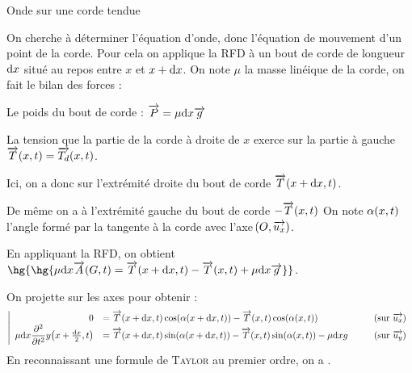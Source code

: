 \documentclass[a4paper,french,bookmarks]{book}
\begin{document}
\begin{example}{Onde sur une corde tendue}{}
\begin{minipage}{0.5\linewidth}
\begin{center}
            \end{center}
        \end{minipage}
        On cherche à déterminer l'équation d'onde, donc l'équation de mouvement d'un point de la corde. Pour cela on applique la RFD à un bout de corde de longueur $\mathrm d x$ situé au repos entre $x$ et $x+\mathrm d x$. On note $\mu$ la masse linéique de la corde, on fait le bilan des forces :
        \begin{enumerate}
            \itt Le poids du bout de corde : $\overrightarrow{P} = \mu\mathrm d x \overrightarrow{g}$
            
            \itt La tension que la partie de la corde à droite de $x$ exerce sur la partie à gauche $\overrightarrow{T}\!\left(x,t\right) = \overrightarrow{T_d}\!\left(x,t\right)$.
            
            Ici, on a donc sur l'extrémité droite du bout de corde $\overrightarrow{T}\!\left(x+\mathrm d x,t\right)$.
            
            De même on a à l'extrémité gauche du bout de corde  $-\overrightarrow{T}\!\left(x,t\right)$
            On note $\alpha\!\left(x,t\right)$ l'angle formé par la tangente à la corde avec l'axe $\!\left(O, \overrightarrow{u_x}\right)$.
        \end{enumerate}
        
        En appliquant la RFD, on obtient \qquad $\hg{\hg{\mu\dif x \vec{A}\p{G,t} = \vec{T}\p{x+\dif x,t}- \vec{T}\p{x,t} +\mu\dif x\vec{g}}}$.

        On projette sur les axes pour obtenir :
        \[ \left\vert\begin{array}{rlc}
            0 &= \vec{T}\p{x+\dif x,t}\cos\p{\alpha\p{x+\dif x, t}} - \vec{T}\p{x,t}\cos\p{\alpha\p{x,t}} & \qquad\p{\text{sur} \ \vec{u_x}}\\
            \mu\dif x \dfrac{\partial^2}{\partial t^2}y\p{x+\frac{\dif x}{2},t} &= \vec{T}\p{x+\dif x,t}\sin\p{\alpha\p{x+\dif x, t}} - \vec{T}\p{x,t}\sin\p{\alpha\p{x,t}} -\mu\dif x g &\qquad\p{\text{sur} \ \vec{u_y}}
        \end{array}\right.\]
        En reconnaissant une formule de \textsc{Taylor} au premier ordre, on a .
        

\end{example}
\end{document}

